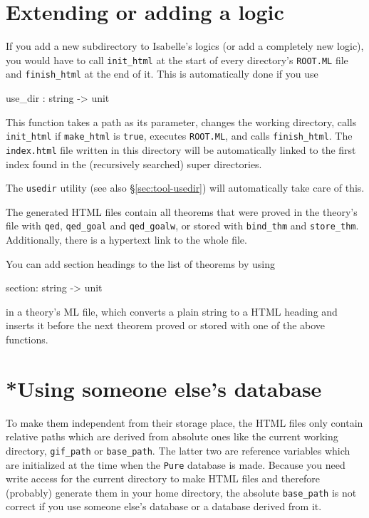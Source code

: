 \section*{Extending or adding a logic}

If you add a new subdirectory to Isabelle's logics (or add a
completely new logic), you would have to call {\tt init_html} at the
start of every directory's {\tt ROOT.ML} file and {\tt finish_html} at
the end of it. This is automatically done if you use

\begin{ttbox}
use_dir : string -> unit
\end{ttbox}

This function takes a path as its parameter, changes the working
directory, calls {\tt init_html} if {\tt make_html} is {\tt true},
executes {\tt ROOT.ML}, and calls {\tt finish_html}. The {\tt
index.html} file written in this directory will be automatically
linked to the first index found in the (recursively searched)
super directories.

The \texttt{usedir} utility (see also \S\ref{sec:tool-usedir}) will
automatically take care of this.

\medskip The generated HTML files contain all theorems that were
proved in the theory's \ML{} file with {\tt qed}, {\tt qed_goal} and
{\tt qed_goalw}, or stored with {\tt bind_thm} and {\tt store_thm}.
Additionally, there is a hypertext link to the whole \ML{} file.

You can add section headings to the list of theorems by using

\begin{ttbox}
section: string -> unit
\end{ttbox}

in a theory's ML file, which converts a plain string to a HTML
heading and inserts it before the next theorem proved or stored with
one of the above functions.


\section*{*Using someone else's database}

To make them independent from their storage place, the HTML files only
contain relative paths which are derived from absolute ones like the
current working directory, {\tt gif_path} or {\tt base_path}. The
latter two are reference variables which are initialized at the time
when the {\tt Pure} database is made. Because you need write access
for the current directory to make HTML files and therefore (probably)
generate them in your home directory, the absolute {\tt base_path} is
not correct if you use someone else's database or a database derived
from it.

